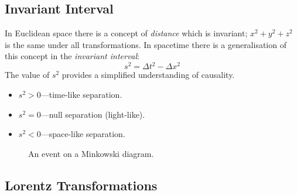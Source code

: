 \subsection{Invariant Interval}
\label{sec:invint}

In Euclidean space there is a concept of \emph{distance} which is
invariant; $x^2 + y^2 + z^2$ is the same under all transformations.
In spacetime there is a generalisation of this concept in the
\emph{invariant interval}:
\begin{equation}
  \label{eq:invariantinter}
  s^2 = \Delta t^2 - \Delta x^2
\end{equation}
The value of $s^2$ provides a simplified understanding of causality.
\begin{itemize}
\item $s^2 > 0$---time-like separation.
\item $s^2 = 0$---null separation (light-like).
\item $s^2 < 0$---space-like separation.
\end{itemize}

\begin{figure} \centering
{}
\caption{An event on a Minkowski diagram.}
\label{fig:minksimple}
\end{figure}

\subsection{Lorentz Transformations}
\label{sec:lorentz}

